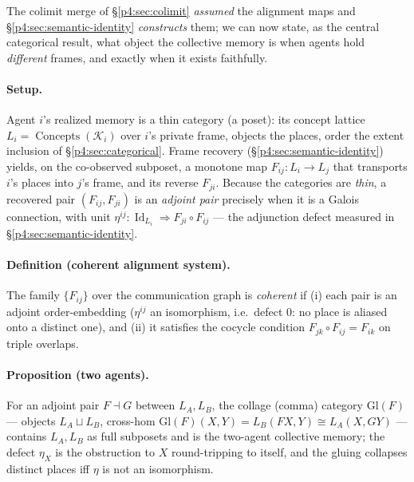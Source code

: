 \documentclass{article}
\begin{document}
The colimit merge of \S\ref{p4:sec:colimit} \emph{assumed} the alignment maps and
\S\ref{p4:sec:semantic-identity} \emph{constructs} them; we can now state, as the
central categorical result, what object the collective memory is when agents
hold \emph{different} frames, and exactly when it exists faithfully.

\paragraph{Setup.} Agent $i$'s realized memory is a thin category (a poset):
its concept lattice $L_i=\operatorname{Concepts}(\mathcal{K}_i)$ over $i$'s
private frame, objects the places, order the extent inclusion of
\S\ref{p4:sec:categorical}. Frame recovery (\S\ref{p4:sec:semantic-identity}) yields,
on the co-observed subposet, a monotone map $F_{ij}:L_i\to L_j$ that transports
$i$'s places into $j$'s frame, and its reverse $F_{ji}$. Because the categories
are \emph{thin}, a recovered pair $(F_{ij},F_{ji})$ is an \emph{adjoint pair}
precisely when it is a Galois connection, with unit
$\eta^{ij}:\operatorname{Id}_{L_i}\Rightarrow F_{ji}\!\circ\!F_{ij}$ --- the
adjunction defect measured in \S\ref{p4:sec:semantic-identity}.

\paragraph{Definition (coherent alignment system).} The family $\{F_{ij}\}$
over the communication graph is \emph{coherent} if (i) each pair is an adjoint
order-embedding ($\eta^{ij}$ an isomorphism, i.e.\ defect $0$: no place is
aliased onto a distinct one), and (ii) it satisfies the cocycle condition
$F_{jk}\!\circ\!F_{ij}=F_{ik}$ on triple overlaps.

\paragraph{Proposition (two agents).} For an adjoint pair $F\dashv G$ between
$L_A,L_B$, the collage (comma) category $\mathrm{Gl}(F)$ --- objects
$L_A\sqcup L_B$, cross-hom $\mathrm{Gl}(F)(X,Y)=L_B(FX,Y)\cong L_A(X,GY)$
\citep{maclane1998categories} --- contains $L_A,L_B$ as full subposets and is
the two-agent collective memory; the defect $\eta_X$ is the obstruction to $X$
round-tripping to itself, and the gluing collapses distinct places iff $\eta$
is not an isomorphism.
\end{document}
